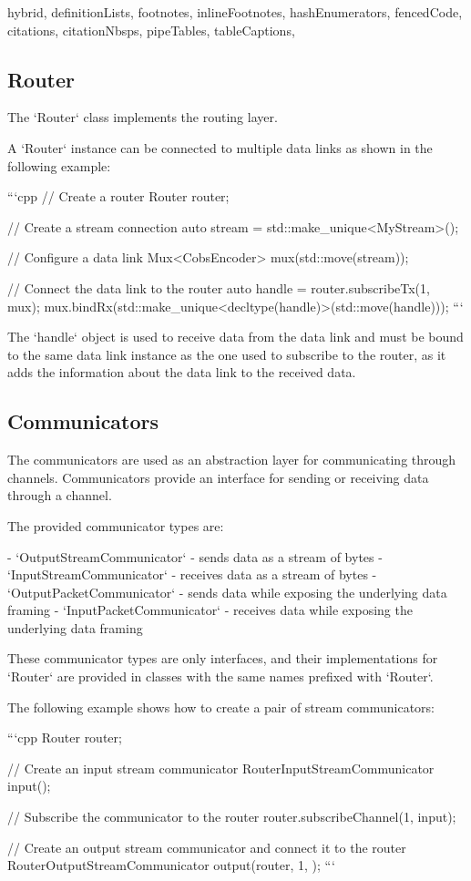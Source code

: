 \begin{markdown*}{%
  hybrid,
  definitionLists,
  footnotes,
  inlineFootnotes,
  hashEnumerators,
  fencedCode,
  citations,
  citationNbsps,
  pipeTables,
  tableCaptions,
}
\subsection{Router}

The `Router` class implements the routing layer.

A `Router` instance can be connected to multiple data links as shown in the following example:

```cpp
// Create a router
Router router;

// Create a stream connection
auto stream = std::make_unique<MyStream>();

// Configure a data link
Mux<CobsEncoder> mux(std::move(stream));

// Connect the data link to the router
auto handle = router.subscribeTx(1, mux);
mux.bindRx(std::make_unique<decltype(handle)>(std::move(handle)));
```

The `handle` object is used to receive data from the data link and must be bound to the same data link instance as the one used to subscribe to the router, as it adds the information about the data link to the received data.

\subsection{Communicators}

The communicators are used as an abstraction layer for communicating through channels. Communicators provide an interface for sending or receiving data through a channel.

The provided communicator types are:

- `OutputStreamCommunicator` - sends data as a stream of bytes
- `InputStreamCommunicator` - receives data as a stream of bytes
- `OutputPacketCommunicator` - sends data while exposing the underlying data framing
- `InputPacketCommunicator` - receives data while exposing the underlying data framing

These communicator types are only interfaces, and their implementations for `Router` are provided in classes with the same names prefixed with `Router`.

The following example shows how to create a pair of stream communicators:

```cpp
Router router;

// Create an input stream communicator
RouterInputStreamCommunicator input({});

// Subscribe the communicator to the router
router.subscribeChannel(1, input);

// Create an output stream communicator and connect it to the router
RouterOutputStreamCommunicator output(router, 1, {});
```


\end{markdown*}
